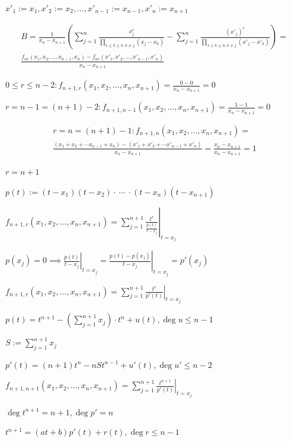\documentclass{article}
\begin{document}
\( x'_{1} := x_{1}, x'_{2} := x_{2}, \ldots, x'_{n-1} := x_{n-1}, x'_{n} := x_{n+1} \)

\begin{multline*}
B = \frac{1}{x_{n}-x_{n+1}}(\sum_{j=1}^{n}\frac{x_{j}^{r}}{\prod_{1 \leq k \leq n, k \neq j}(x_{j}-x_{k})} - \sum_{j=1}^{n}\frac{{(x'_{j})}^{r}}{\prod_{1 \leq k \leq n, k \neq j}(x'_{j}-x'_{k})}) = \\
\frac{f_{nr}(x_{1},x_{2},\ldots,x_{n-1},x_{n}) - f_{nr}(x'_{1},x'_{2},\ldots,x'_{n-1},x'_{n})}{x_{n}-x_{n+1}}
\end{multline*}

\( 0 \leq r \leq n - 2: f_{n+1,r}(x_{1},x_{2},\ldots,x_{n},x_{n+1}) = \frac{0 - 0}{x_{n}-x_{n+1}} = 0 \)

\( r = n - 1 = (n + 1) - 2: f_{n+1,n - 1}(x_{1},x_{2},\ldots,x_{n},x_{n+1}) = \frac{1 - 1}{x_{n}-x_{n+1}} = 0 \)

\begin{multline*}
r = n = (n + 1) - 1: f_{n+1,n}(x_{1},x_{2},\ldots,x_{n},x_{n+1}) = \\
\frac{(x_{1} + x_{2} + \cdots x_{n-1} + x_{n}) - (x'_{1} + x'_{2} + \cdots x'_{n-1} + x'_{n})}{x_{n}-x_{n+1}} = \frac{x_{n}-x_{n+1}}{x_{n}-x_{n+1}} = 1
\end{multline*}

\( r = n + 1 \)

\( p(t) := (t-x_{1})(t-x_{2}) \cdot\ \cdots\ \cdot (t-x_{n})(t-x_{n+1}) \)

\( f_{n+1,r}(x_{1},x_{2},\ldots,x_{n},x_{n+1}) = \sum_{j=1}^{n+1} \left.\frac{t^{r}}{\frac{p(t)}{t-x_{j}}}\right|_{t = x_{j}} \)

\( p(x_{j}) = 0 \implies \left.\frac{p(t)}{t-x_{j}}\right|_{t=x_{j}} = \left.\frac{p(t)-p(x_{j})}{t-x_{j}}\right|_{t=x_{j}} = p'(x_{j}) \)

\( f_{n+1,r}(x_{1},x_{2},\ldots,x_{n},x_{n+1}) = \sum_{j=1}^{n+1} \left.\frac{t^{r}}{p'(t)}\right|_{t = x_{j}} \)

\( p(t)=t^{n+1} - (\sum_{j=1}^{n+1} x_{j}) \cdot t^{n} + u(t), \deg u \leq n-1 \)

\( S := \sum_{j=1}^{n+1} x_{j} \)

\( p'(t) = (n+1)t^{n} - nSt^{n-1} + u'(t), \deg u' \leq n-2 \)

\( f_{n+1,n+1}(x_{1},x_{2},\ldots,x_{n},x_{n+1}) = \sum_{j=1}^{n+1} \left.\frac{t^{n+1}}{p'(t)}\right|_{t = x_{j}} \)

\( \deg t^{n+1} = n + 1, \deg p' = n \)

\( t^{n+1} = (at+b)p'(t) + r(t), \deg r \leq n - 1 \)
\end{document}
